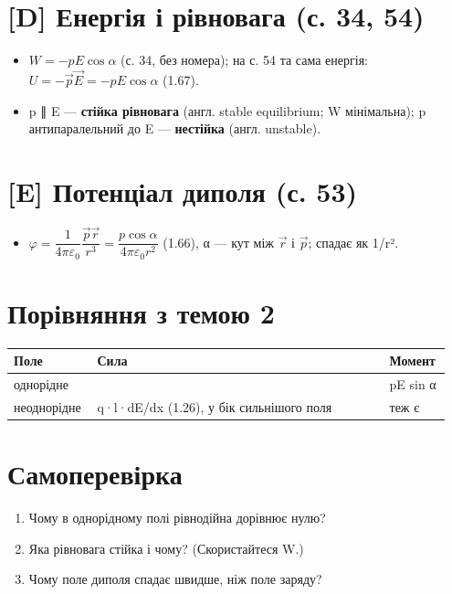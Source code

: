 \documentclass[11pt,a4paper,oneside]{book}
\begin{document}
\section*{[D] Енергія і рівновага (с. 34, 54)}
\begin{itemize}
\item $W = -pE\cos\alpha$ (с. 34, без номера); на с. 54 та сама енергія: $U = -\vec p\vec E = -pE\cos\alpha$ (1.67).
\item p ∥ E — \textbf{стійка рівновага} (англ. stable equilibrium; W мінімальна); p антипаралельний до E — \textbf{нестійка} (англ. unstable).
\end{itemize}

\section*{[E] Потенціал диполя (с. 53)}
\begin{itemize}
\item $\varphi = \dfrac{1}{4\pi\varepsilon_0}\dfrac{\vec p\vec r}{r^3} = \dfrac{p\cos\alpha}{4\pi\varepsilon_0 r^2}$ (1.66), α — кут між $\vec r$ і $\vec p$; спадає як 1/r².
\end{itemize}

\section*{Порівняння з темою 2}
{\small
\begin{longtable}{>{\raggedright\arraybackslash}p{0.181\linewidth}>{\raggedright\arraybackslash}p{0.640\linewidth}>{\raggedright\arraybackslash}p{0.131\linewidth}}
\toprule
\textbf{Поле} & \textbf{Сила} & \textbf{Момент} \\
\midrule
\endhead
однорідне & 0 & pE sin α \\
неоднорідне & q·l·dE/dx (1.26), у бік сильнішого поля & теж є \\
\bottomrule
\end{longtable}
}

\section*{Самоперевірка}
\begin{enumerate}
\item Чому в однорідному полі рівнодійна дорівнює нулю?
\item Яка рівновага стійка і чому? (Скористайтеся W.)
\item Чому поле диполя спадає швидше, ніж поле заряду?
\end{enumerate}
\end{document}
